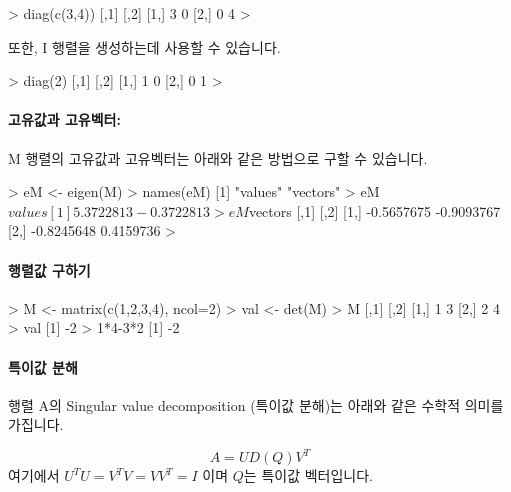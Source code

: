 \documentclass{report}
\begin{document}
\begin{Schunk}
\begin{Soutput}
> diag(c(3,4))
     [,1] [,2]
[1,]    3    0
[2,]    0    4
> 
\end{Soutput}
\end{Schunk}

또한, I 행렬을 생성하는데 사용할 수 있습니다. 

\begin{Schunk}
\begin{Soutput}
> diag(2)
     [,1] [,2]
[1,]    1    0
[2,]    0    1
>
\end{Soutput}
\end{Schunk}

\paragraph{고유값과 고유벡터:}

M 행렬의 고유값과 고유벡터는 아래와 같은 방법으로 구할 수 있습니다. 

\begin{Schunk}
\begin{Soutput}
> eM <- eigen(M)
> names(eM)
[1] "values"  "vectors"
> eM$values
[1]  5.3722813 -0.3722813
> eM$vectors
           [,1]       [,2]
[1,] -0.5657675 -0.9093767
[2,] -0.8245648  0.4159736
> 
\end{Soutput}
\end{Schunk}

\paragraph{행렬값 구하기}

\begin{Schunk}
\begin{Soutput}
> M <- matrix(c(1,2,3,4), ncol=2)
> val <- det(M)
> M
     [,1] [,2]
[1,]    1    3
[2,]    2    4
> val
[1] -2
> 1*4-3*2
[1] -2
\end{Soutput}
\end{Schunk}

\paragraph{특이값 분해}

행렬 A의 Singular value decomposition (특이값 분해)는 아래와 같은 수학적 의미를 가집니다. 

\begin{equation}
A = U D(Q) V^T
\end{equation}
%
여기에서 $ U^T U = V^T V = VV^T = I $ 이며 $Q$는 특이값 벡터입니다. 
\end{document}
